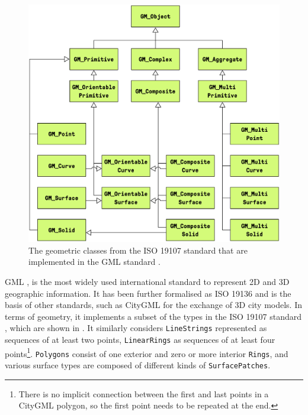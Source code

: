 \begin{figure}[t]
  \begin{center}
    \includegraphics[width=\linewidth]{figs/gml}
  \end{center}
  \caption[Geometry in GML]{The geometric classes from the ISO 19107 standard \citep{ISO19107:2005} that are implemented in the GML standard \citep{GML3.2.1}.}
\label{fig:gml}
\end{figure}

GML \citep{GML3.3}, is the most widely used international standard to represent 2D and 3D geographic information.
It has been further formalised as ISO 19136 \citep{ISO19136:2007} and is the basis of other standards, such as CityGML \citep{CityGML2} for the exchange of 3D city models.
In terms of geometry, it implements a subset of the types in the ISO 19107 standard \citep{ISO19107:2005}, which are shown in .
It similarly considers \texttt{LineStrings} represented as sequences of at least two points, \texttt{LinearRings} as sequences of at least four points\footnote{There is no implicit connection between the first and last points in a CityGML polygon, so the first point needs to be repeated at the end.}.
\texttt{Polygons} consist of one exterior and zero or more interior \texttt{Rings}, and various surface types are composed of different kinds of \texttt{SurfacePatches}.

